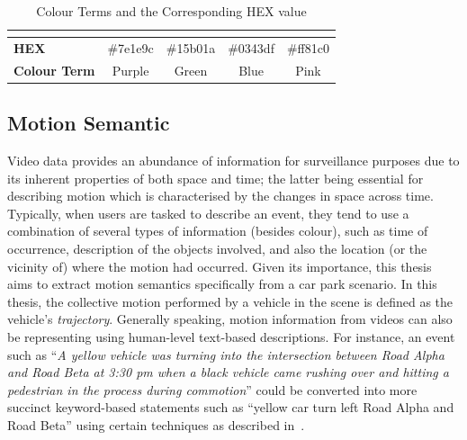\begin{table}[!ht]
\begin{tabular}{lcccc}
\multicolumn{1}{l|}{}                     & \multicolumn{1}{l|}{\cellcolor[HTML]{7E1E9C}} & \multicolumn{1}{l|}{\cellcolor[HTML]{15B01A}} & \multicolumn{1}{l|}{\cellcolor[HTML]{0343DF}} & \multicolumn{1}{l|}{\cellcolor[HTML]{FF81C0}} \\ \hline
\multicolumn{1}{|l|}{\textbf{HEX}}        & \multicolumn{1}{c|}{\#7e1e9c}                 & \multicolumn{1}{c|}{\#15b01a}                 & \multicolumn{1}{c|}{\#0343df}                 & \multicolumn{1}{c|}{\#ff81c0}                 \\ \hline
\multicolumn{1}{|l|}{\textbf{Colour Term}}  & \multicolumn{1}{c|}{Purple}                   & \multicolumn{1}{c|}{Green}                    & \multicolumn{1}{c|}{Blue}                     & \multicolumn{1}{c|}{Pink}                     \\ \hline
\end{tabular}
\caption{Colour Terms and the Corresponding HEX value}
\label{table:colorshex}
\end{table}



\subsection{Motion Semantic}

Video data provides an abundance of information for surveillance purposes due to its inherent properties of both space and time; the latter being essential for describing motion which is characterised by the changes in space across time.
Typically, when users are tasked to describe an event, they tend to use a combination of several types of information (besides colour), such as time of occurrence, description of the objects involved, and also the location (or the vicinity of) where the motion had occurred.
Given its importance, this thesis aims to extract motion semantics specifically from a car park scenario.
In this thesis, the collective motion performed by a vehicle in the scene is defined as the vehicle's \emph{trajectory}.
Generally speaking, motion information from videos can also be representing using human-level text-based descriptions. For instance, an event such as ``\textit{A yellow vehicle was turning into the intersection between Road Alpha and Road Beta at 3:30 pm when a black vehicle came rushing over and hitting a pedestrian in the process during commotion}'' could be converted into more succinct keyword-based statements such as ``yellow car turn left Road Alpha and Road Beta'' using certain techniques as described in~\cite{feris2012large,momin2015vehicle,yang2015semantic}.

